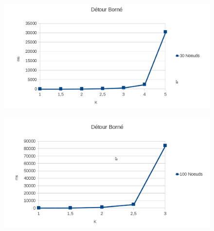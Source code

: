   \begin{figure}[!h] 
\begin{center}
  \includegraphics[scale=0.40]{a24.png}
  \end{center}
\end{figure} 
  \begin{figure}[!h] 
\begin{center}
  \includegraphics[scale=0.40]{a25.png}
\end{center}
\end{figure} 
